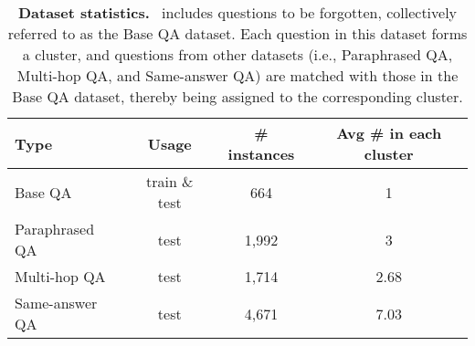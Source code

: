 \begin{table}[h]
\resizebox{1.0\linewidth}{!}
{
\begin{tabular}{lccc}\toprule
\bf Type  & \bf Usage & \bf \# instances & \bf Avg \# in each cluster \\ \toprule
Base QA & train \& test & 664 & 1 \\\midrule
Paraphrased QA & test & 1,992 & 3 \\
Multi-hop QA & test & 1,714 & 2.68 \\
Same-answer QA & test & 4,671 & 7.03 \\\bottomrule
\end{tabular}   
}
\caption{\textbf{Dataset statistics.} \ourdata~includes questions to be forgotten, collectively referred to as the Base QA dataset. Each question in this dataset forms a cluster, and questions from other datasets (i.e., Paraphrased QA, Multi-hop QA, and Same-answer QA) are matched with those in the Base QA dataset, thereby being assigned to the corresponding cluster.}
\label{tab:stats}
\end{table}




    